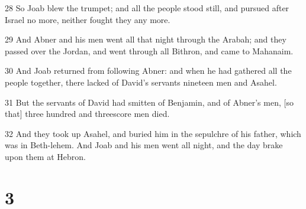 \par 28 So Joab blew the trumpet; and all the people stood still, and pursued after Israel no more, neither fought they any more.
\par 29 And Abner and his men went all that night through the Arabah; and they passed over the Jordan, and went through all Bithron, and came to Mahanaim.
\par 30 And Joab returned from following Abner: and when he had gathered all the people together, there lacked of David's servants nineteen men and Asahel.
\par 31 But the servants of David had smitten of Benjamin, and of Abner's men, [so that] three hundred and threescore men died.
\par 32 And they took up Asahel, and buried him in the sepulchre of his father, which was in Beth-lehem. And Joab and his men went all night, and the day brake upon them at Hebron.

\chapter{3}

